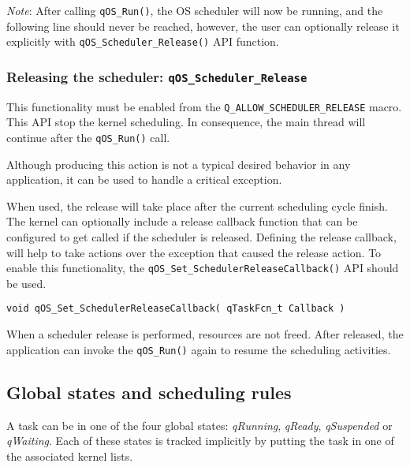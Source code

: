\begin{tcolorbox}
\ArrowBoldDownRight \textit{Note}: After calling \lstinline{qOS_Run()}, the OS scheduler will now be running, and the following line should never be reached, however, the user can optionally release it explicitly with \lstinline{qOS_Scheduler_Release()} API function.
\end{tcolorbox}

\subsubsection{Releasing the scheduler: \lstinline{qOS_Scheduler_Release} }
This functionality must be enabled from the \lstinline{Q_ALLOW_SCHEDULER_RELEASE} macro.
This API  stop the kernel scheduling. In consequence, the main thread will continue after the \lstinline{qOS_Run()} call. 

Although producing this action is not a typical desired behavior in any application, it can be used to handle a critical exception.

When used, the release will take place after the current scheduling cycle finish. The kernel can optionally include a release callback function that can be configured to get called if the scheduler is released. 
Defining the release callback,  will help to take actions over the exception that caused the release action. To enable this functionality, the \lstinline{qOS_Set_SchedulerReleaseCallback()}  API should be used. \\

\begin{lstlisting}[style=CStyle]
void qOS_Set_SchedulerReleaseCallback( qTaskFcn_t Callback )
\end{lstlisting}

\begin{tcolorbox}
\HandRight When a scheduler release is performed, resources are not freed. After released, the application can invoke the \lstinline{qOS_Run()} again to resume the scheduling activities.
\end{tcolorbox}

\subsection{Global states and scheduling rules}

A task can be in one of the four global states: \textit{qRunning}, \textit{qReady}, \textit{qSuspended} or \textit{qWaiting}. Each of these states is tracked implicitly by putting the task in one of the associated kernel lists. 

